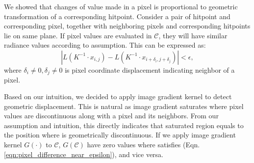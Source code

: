 We showed that changes of value made in a pixel is proportional to geometric transformation of a corresponding hitpoint.
Consider a pair of hitpoint and corresponding pixel, together with neighboring pixels and corresponding hitpoints lie on same plane.
If pixel values are evaluated in $\mathcal{C}$, they will have similar radiance values according to assumption. 
This can be expressed as:
\begin{equation}
    |L(K^{-1}\cdot x_{i,j})-L(K^{-1}\cdot x_{i+\delta_i, j+\delta_j})| < \epsilon, 
    \label{eqn:pixel_difference_near_epsilon}
\end{equation}
where $\delta_i \neq 0, \delta_j \neq 0$ is pixel coordinate displacement indicating neighbor of a pixel.

Based on our intuition, we decided to apply image gradient kernel to detect geometric displacement. 
This is natural as image gradient saturates where pixel values are discontinuous along with a pixel and its neighbors.
From our assumption and intuition, this directly indicates that saturated region equals to the position where is geometrically discontinuous.
If we apply image gradient kernel $G(\cdot)$ to $\mathcal{C}$, $G(\mathcal{C})$ have zero values where satisfies (Eqn. \ref{eqn:pixel_difference_near_epsilon}), and vice versa.

